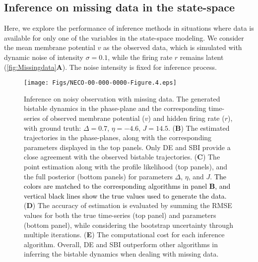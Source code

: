 \documentclass[12pt]{article}
\begin{document}
\subsection{Inference on missing data in the state-space}

Here, we explore the performance of inference methods in situations where data is available for only one of the variables in the state-space modeling. We consider the mean membrane potential $v$ as the observed data, which is simulated with dynamic noise of intensity $\sigma = 0.1$, while the firing rate $r$ remains latent (\autoref{fig:Missingdata}\textbf{A}). The noise intensity is fixed for inference process.

\begin{figure}
    \centering
    \texttt{[image: Figs/NECO-00-000-0000-Figure.4.eps]}
    \caption{Inference on noisy observation with missing data. The generated bistable dynamics in the phase-plane and the corresponding time-series of observed membrane potential ($v$) and hidden firing rate ($r$), with ground truth: $\Delta=0.7$, $\eta=-4.6$, $J=14.5$.  (\textbf{B}) The estimated trajectories in the phase-planes, along with the corresponding parameters displayed in the top panels. Only DE and SBI provide a close agreement with the observed bistable trajectories. (\textbf{C}) The point estimation along with the profile likelihood (top panels), and the full posterior (bottom panels) for parameters $\Delta$, $\eta$, and $J$. \textcolor{black}{The colors are matched to the corresponding algorithms in panel \textbf{B}, and vertical black lines show the true values used to generate the data.} (\textbf{D}) The accuracy of estimation is evaluated by summing the RMSE values for both the true time-series (top panel) and parameters (bottom panel),  while considering the bootstrap uncertainty through multiple iterations. (\textbf{E}) The computational cost for each inference algorithm.  Overall,  DE and SBI outperform other algorithms in inferring the bistable dynamics when dealing with missing data.
    }
    \label{fig:Missingdata}
\end{figure}
\end{document}
